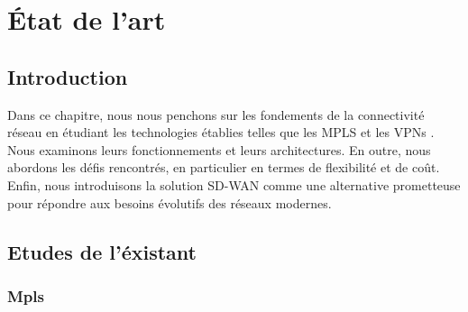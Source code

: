 
\chapter{État de l'art }
\newpage


\section*{Introduction }
Dans ce chapitre, nous nous penchons sur les fondements de la connectivité réseau en étudiant les technologies établies telles que les MPLS et les VPNs . Nous examinons leurs fonctionnements et leurs architectures. En outre, nous abordons les défis rencontrés, en particulier en termes de flexibilité et de coût. Enfin, nous introduisons la solution SD-WAN comme une alternative prometteuse pour répondre aux besoins évolutifs des réseaux modernes.

\section{Etudes de l'éxistant }
\subsection{Mpls }
